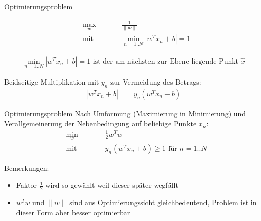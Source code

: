 \documentclass[ngerman]{beamer}
\newcommand{\norm}[1]{\lVert#1\rVert}
\begin{document}
\begin{frame}{Optimierungsproblem}
	
\begin{subequations}
	\begin{alignat*}{2}
		&\!\max_{w}        &\qquad&  \frac{1}{\norm{w}} \\
		&\text{mit } &      & \min_{n=1..N} |w^{T} x_{n} + b| = 1
	\end{alignat*}
\end{subequations}

\begin{equation*}
	\begin{aligned}
		\min_{n=1..N} |w^{T} x_{n} + b| = 1 \text{  ist der am nächsten zur Ebene liegende Punkt } \hat{x}
	\end{aligned}
\end{equation*}



Beidseitige Multiplikation mit $y_{n}$ zur Vermeidung des Betrags:
\begin{equation*}
	\begin{aligned}
		|w^{T} x_{n} + b| &= y_{n} (w^{T} x_{n} + b)
	\end{aligned}
\end{equation*}
	
\end{frame}


\begin{frame}{Optimierungsproblem}
	Nach Umformung (Maximierung in Minimierung) und Verallgemeinerung der Nebenbedingung auf beliebige Punkte $x_{n}$:
	\begin{subequations}
		\begin{alignat*}{2}
			&\!\min_{w}        &\qquad&  \frac{1}{2} w^{T} w \\
			&\text{mit } &      & y_n (w^{T} x_{n} + b) \geq 1 \text{ für } n=1..N 
		\end{alignat*}
	\end{subequations}

	Bemerkungen:
	\begin{itemize}
		\item Faktor $\frac{1}{2}$ wird so gewählt weil dieser später wegfällt
		\item $w^{T} w $ und $\norm{w}$ sind aus Optimierungssicht gleichbedeutend, Problem ist in dieser Form aber besser optimierbar
	\end{itemize}

\end{frame}
\end{document}
